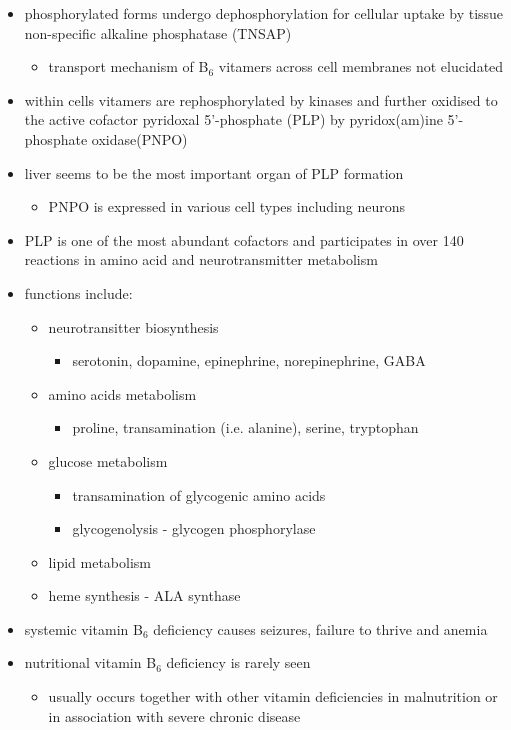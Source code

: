 \documentclass{scrartcl}
\begin{document}
\begin{itemize}
\item phosphorylated forms undergo dephosphorylation for cellular uptake
by tissue non-specific alkaline phosphatase (TNSAP)
\begin{itemize}
\item transport mechanism of B\(_{\text{6}}\) vitamers across cell membranes not
elucidated
\end{itemize}
\item within cells vitamers are rephosphorylated by kinases and further oxidised to the
active cofactor pyridoxal 5’-phosphate (PLP) by pyridox(am)ine
5’-phosphate oxidase(PNPO)
\item liver seems to be the most important organ of PLP formation
\begin{itemize}
\item PNPO is expressed in various cell types including neurons
\end{itemize}
\item PLP is one of the most abundant cofactors and participates in over
140 reactions in amino acid and neurotransmitter metabolism
\item functions include:
\begin{itemize}
\item neurotransitter biosynthesis
\begin{itemize}
\item serotonin, dopamine, epinephrine, norepinephrine, GABA
\end{itemize}
\item amino acids metabolism
\begin{itemize}
\item proline, transamination (i.e. alanine), serine, tryptophan
\end{itemize}
\item glucose metabolism
\begin{itemize}
\item transamination of glycogenic amino acids
\item glycogenolysis - glycogen phosphorylase
\end{itemize}
\item lipid metabolism
\item heme synthesis - ALA synthase
\end{itemize}
\item systemic vitamin B\(_{\text{6}}\) deficiency causes seizures, failure to thrive
and anemia
\item nutritional vitamin B\(_{\text{6}}\) deficiency is rarely seen
\begin{itemize}
\item usually occurs together with other vitamin deficiencies in
malnutrition or in association with severe chronic disease
\end{itemize}
\end{itemize}
\end{document}
